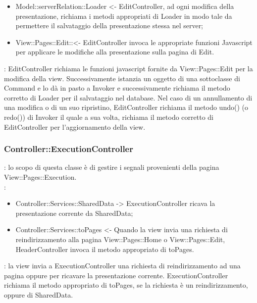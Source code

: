 {{\begin{itemize}
			\item Model::\-serverRelation::\-Loader <- EditController, ad ogni modifica della presentazione, richiama i metodi appropriati di Loader in modo tale da permettere il salvataggio della presentazione stessa nel server;

			\item View::\-Pages::\-Edit:: <- EditController invoca le appropriate funzioni Javascript per applicare le modifiche alla presentazione sulla pagina di Edit.
		\end{itemize} 
		\textbf{\interfacce}: EditController richiama le funzioni javascript fornite da View::\-Pages::\-Edit per la modifica della view. Successivamente istanzia un oggetto di una sottoclasse di Command e lo dà in pasto a Invoker e successivamente richiama il metodo corretto di Loader per il salvataggio nel database. Nel caso di un annullamento di una modifica o di un suo ripristino, EditController richiama il metodo undo() (o redo()) di Invoker il quale a sua volta, richiama il metodo corretto di EditController per l'aggiornamento della view.
	}
		
	\subsubsection{Controller::\-ExecutionController}{
		\textbf{\tipo}: lo scopo di questa classe è di gestire i segnali provenienti della pagina View::\-Pages::\-Execution.\\	
		\textbf{\relaz}:
		\begin{itemize}
			\item Controller::\-Services::\-SharedData -> ExecutionController ricava la presentazione corrente da SharedData;
			\item Controller::\-Services::\-toPages <- Quando la view invia una richiesta di reindirizzamento alla pagina View::\-Pages::\-Home o View::\-Pages::\-Edit, HeaderController invoca il metodo appropriato di toPages.
		\end{itemize}
		\textbf{\interfacce}: la view invia a ExecutionController una richiesta di reindirizzamento ad una pagina oppure per ricavare la presentazione corrente. ExecutionController richiama il metodo appropriato di toPages, se la richiesta è un reindirizzamento, oppure di SharedData.
	}
	
}
